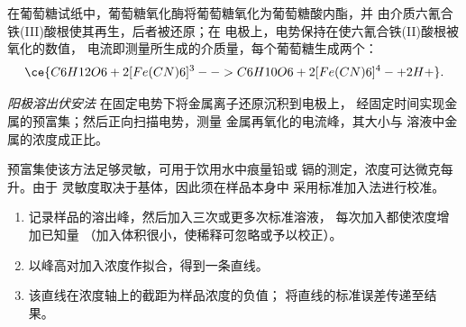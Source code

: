 在葡萄糖试纸中，葡萄糖氧化酶将葡萄糖氧化为葡萄糖酸内酯，并
由介质六氰合铁(III)酸根使其再生，后者被还原；在
电极上，电势保持在使六氰合铁(II)酸根被氧化的数值，
电流即测量所生成的介质量，每个葡萄糖生成两个：
\[
  \ce{C6H12O6 + 2 [Fe(CN)6]^3- -> C6H10O6 + 2 [Fe(CN)6]^4- + 2 H+} .
\]

\begin{definition}[阳极溶出伏安法]\label{def:b3:electrode-kinetics:stripping}
\emph{阳极溶出伏安法}
在固定电势下将金属离子还原沉积到电极上，
经固定时间实现金属的预富集；然后正向扫描电势，测量
金属再氧化的电流峰，其大小与
溶液中金属的浓度成正比。
\end{definition}

预富集使该方法足够灵敏，可用于饮用水中痕量铅或
镉的测定，浓度可达微克每升。由于
灵敏度取决于基体，因此须在样品本身中
采用标准加入法进行校准。

\begin{method}[结合溶出的标准加入法]\label{met:b3:electrode-kinetics:standard-addition}
\begin{enumerate}
  \item 记录样品的溶出峰，然后加入三次或更多次标准溶液，
        每次加入都使浓度增加已知量
        （加入体积很小，使稀释可忽略或予以校正）。
  \item 以峰高对加入浓度作拟合，得到一条直线。
  \item 该直线在浓度轴上的截距为样品浓度的负值；
        将直线的标准误差传递至结果。
\end{enumerate}
\end{method}


